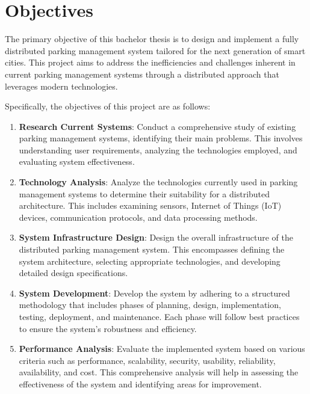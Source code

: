 \documentclass[oneside, 12pt, a4paper, draft]{book}
\begin{document}
\chapter{Objectives}
\label{sec:org9758daa}
The primary objective of this bachelor thesis is to design and implement a fully distributed parking management system tailored for the next generation of smart cities. This project aims to address the inefficiencies and challenges inherent in current parking management systems through a distributed approach that leverages modern technologies.

Specifically, the objectives of this project are as follows:

\begin{enumerate}
\item \textbf{Research Current Systems}: Conduct a comprehensive study of existing parking management systems, identifying their main problems. This involves understanding user requirements, analyzing the technologies employed, and evaluating system effectiveness.

\item \textbf{Technology Analysis}: Analyze the technologies currently used in parking management systems to determine their suitability for a distributed architecture. This includes examining sensors, Internet of Things (IoT) devices, communication protocols, and data processing methods.

\item \textbf{System Infrastructure Design}: Design the overall infrastructure of the distributed parking management system. This encompasses defining the system architecture, selecting appropriate technologies, and developing detailed design specifications.

\item \textbf{System Development}: Develop the system by adhering to a structured methodology that includes phases of planning, design, implementation, testing, deployment, and maintenance. Each phase will follow best practices to ensure the system's robustness and efficiency.

\item \textbf{Performance Analysis}: Evaluate the implemented system based on various criteria such as performance, scalability, security, usability, reliability, availability, and cost. This comprehensive analysis will help in assessing the effectiveness of the system and identifying areas for improvement.
\end{enumerate}
\end{document}
